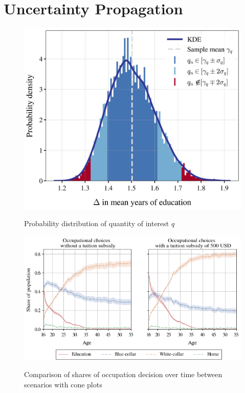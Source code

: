\section{Uncertainty Propagation}
\thispagestyle{plain} %

\begin{figure}[H]
	\caption{Probability distribution of quantity of interest $q$}
	\centering
	\includegraphics[scale=0.7]{../scrypy/figures/distplot}
	\label{fig:dist}
\end{figure}

\begin{figure}[H]
	\caption{Comparison of shares of occupation decision over time between scenarios with cone plots}
	\centering
	\includegraphics[scale=0.75]{../scrypy/figures/cone_plot_choice_shares}
	\label{fig:paths}
\end{figure}


